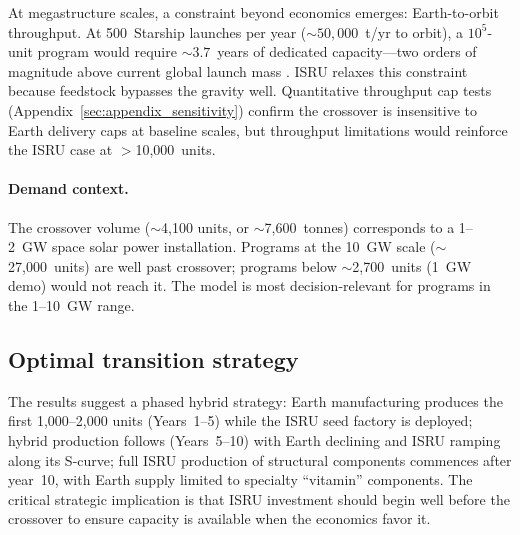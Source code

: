 \documentclass[preprint,12pt]{elsarticle}
\begin{document}
At megastructure scales, a constraint beyond economics emerges: Earth-to-orbit throughput. At 500~Starship launches per year (${\sim}50{,}000$~t/yr to orbit), a $10^5$-unit program would require ${\sim}3.7$~years of dedicated capacity---two orders of magnitude above current global launch mass \cite{jones2022}. ISRU relaxes this constraint because feedstock bypasses the gravity well. Quantitative throughput cap tests (Appendix~\ref{sec:appendix_sensitivity}) confirm the crossover is insensitive to Earth delivery caps at baseline scales, but throughput limitations would reinforce the ISRU case at $>$10{,}000~units.

\paragraph{Demand context.} The crossover volume ($\sim$4,100 units, or $\sim$7,600~tonnes) corresponds to a 1--2~GW space solar power installation. Programs at the 10~GW scale ($\sim$27,000~units) are well past crossover; programs below $\sim$2,700~units (1~GW demo) would not reach it. The model is most decision-relevant for programs in the 1--10~GW range.

\subsection{Optimal transition strategy}

The results suggest a phased hybrid strategy: Earth manufacturing produces the first 1{,}000--2{,}000 units (Years~1--5) while the ISRU seed factory is deployed; hybrid production follows (Years~5--10) with Earth declining and ISRU ramping along its S-curve; full ISRU production of structural components commences after year~10, with Earth supply limited to specialty ``vitamin'' components. The critical strategic implication is that ISRU investment should begin well before the crossover to ensure capacity is available when the economics favor it.
\end{document}
